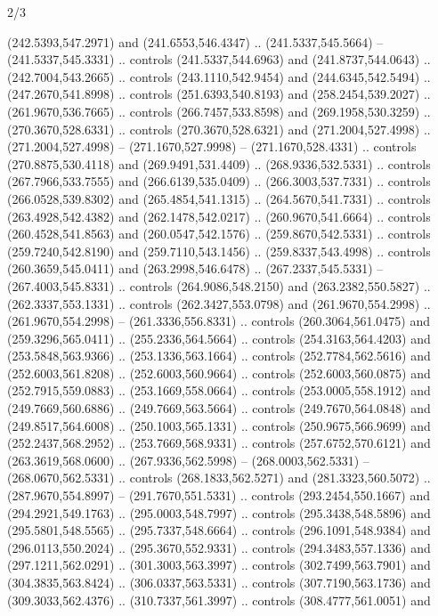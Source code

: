 \begin{flagdescription}{2/3}
\begin{scope}[xshift=0.5\flaglength,yshift=0.5\flagwidth,scale=\flagwidth/525.28]
\begin{scope}[y=0.1mm, x=0.1mm, yscale=-1,shift={(-381.5,-404)}]
\begin{scope}[shift={(5.25001,4.53053)},miter limit=4.00,line width=0.800\lw]
  (242.5393,547.2971) and (241.6553,546.4347) .. (241.5337,545.5664) --
  (241.5337,545.3331) .. controls (241.5337,544.6963) and (241.8737,544.0643) ..
  (242.7004,543.2665) .. controls (243.1110,542.9454) and (244.6345,542.5494) ..
  (247.2670,541.8998) .. controls (251.6393,540.8193) and (258.2454,539.2027) ..
  (261.9670,536.7665) .. controls (266.7457,533.8598) and (269.1958,530.3259) ..
  (270.3670,528.6331) .. controls (270.3670,528.6321) and (271.2004,527.4998) ..
  (271.2004,527.4998) -- (271.1670,527.9998) -- (271.1670,528.4331) .. controls
  (270.8875,530.4118) and (269.9491,531.4409) .. (268.9336,532.5331) .. controls
  (267.7966,533.7555) and (266.6139,535.0409) .. (266.3003,537.7331) .. controls
  (266.0528,539.8302) and (265.4854,541.1315) .. (264.5670,541.7331) .. controls
  (263.4928,542.4382) and (262.1478,542.0217) .. (260.9670,541.6664) .. controls
  (260.4528,541.8563) and (260.0547,542.1576) .. (259.8670,542.5331) .. controls
  (259.7240,542.8190) and (259.7110,543.1456) .. (259.8337,543.4998) .. controls
  (260.3659,545.0411) and (263.2998,546.6478) .. (267.2337,545.5331) --
  (267.4003,545.8331) .. controls (264.9086,548.2150) and (263.2382,550.5827) ..
  (262.3337,553.1331) .. controls (262.3427,553.0798) and (261.9670,554.2998) ..
  (261.9670,554.2998) -- (261.3336,556.8331) .. controls (260.3064,561.0475) and
  (259.3296,565.0411) .. (255.2336,564.5664) .. controls (254.3163,564.4203) and
  (253.5848,563.9366) .. (253.1336,563.1664) .. controls (252.7784,562.5616) and
  (252.6003,561.8208) .. (252.6003,560.9664) .. controls (252.6003,560.0875) and
  (252.7915,559.0883) .. (253.1669,558.0664) .. controls (253.0005,558.1912) and
  (249.7669,560.6886) .. (249.7669,563.5664) .. controls (249.7670,564.0848) and
  (249.8517,564.6008) .. (250.1003,565.1331) .. controls (250.9675,566.9699) and
  (252.2437,568.2952) .. (253.7669,568.9331) .. controls (257.6752,570.6121) and
  (263.3619,568.0600) .. (267.9336,562.5998) -- (268.0003,562.5331) --
  (268.0670,562.5331) .. controls (268.1833,562.5271) and (281.3323,560.5072) ..
  (287.9670,554.8997) -- (291.7670,551.5331) .. controls (293.2454,550.1667) and
  (294.2921,549.1763) .. (295.0003,548.7997) .. controls (295.3438,548.5896) and
  (295.5801,548.5565) .. (295.7337,548.6664) .. controls (296.1091,548.9384) and
  (296.0113,550.2024) .. (295.3670,552.9331) .. controls (294.3483,557.1336) and
  (297.1211,562.0291) .. (301.3003,563.3997) .. controls (302.7499,563.7901) and
  (304.3835,563.8424) .. (306.0337,563.5331) .. controls (307.7190,563.1736) and
  (309.3033,562.4376) .. (310.7337,561.3997) .. controls (308.4777,561.0051) and

\end{scope}
\end{scope}
\end{scope}
\end{flagdescription}
